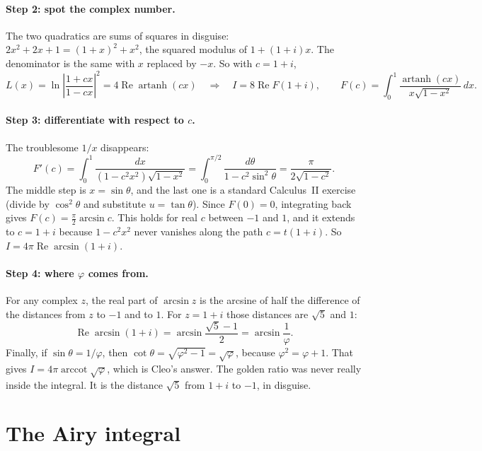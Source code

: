 \documentclass[11pt]{article}
\DeclareMathOperator{\arccot}{arccot}
\DeclareMathOperator{\artanh}{artanh}
\renewcommand{\Re}{\operatorname{Re}}
\begin{document}
\paragraph{Step 2: spot the complex number.} The two quadratics are sums of squares in disguise: $2x^2+2x+1=(1+x)^2+x^2$, the squared modulus of $1+(1+i)x$. The denominator is the same with $x$ replaced by $-x$. So with $c=1+i$,
\[
L(x)=\ln\left|\frac{1+cx}{1-cx}\right|^2=4\Re\artanh(cx)
\quad\Longrightarrow\quad
I=8\Re F(1+i),\qquad F(c)=\int_0^1\frac{\artanh(cx)}{x\sqrt{1-x^2}}\,dx.
\]

\paragraph{Step 3: differentiate with respect to $c$.} The troublesome $1/x$ disappears:
\[
F'(c)=\int_0^1\frac{dx}{(1-c^2x^2)\sqrt{1-x^2}}=\int_0^{\pi/2}\frac{d\theta}{1-c^2\sin^2\theta}=\frac{\pi}{2\sqrt{1-c^2}}.
\]
The middle step is $x=\sin\theta$, and the last one is a standard Calculus~II exercise (divide by $\cos^2\theta$ and substitute $u=\tan\theta$). Since $F(0)=0$, integrating back gives $F(c)=\frac{\pi}{2}\arcsin c$. This holds for real $c$ between $-1$ and $1$, and it extends to $c=1+i$ because $1-c^2x^2$ never vanishes along the path $c=t(1+i)$. So $I=4\pi\Re\arcsin(1+i)$.

\paragraph{Step 4: where $\varphi$ comes from.} For any complex $z$, the real part of $\arcsin z$ is the arcsine of half the difference of the distances from $z$ to $-1$ and to $1$. For $z=1+i$ those distances are $\sqrt5$ and $1$:
\[
\Re\arcsin(1+i)=\arcsin\frac{\sqrt5-1}{2}=\arcsin\frac{1}{\varphi}.
\]
Finally, if $\sin\theta=1/\varphi$, then $\cot\theta=\sqrt{\varphi^2-1}=\sqrt{\varphi}$, because $\varphi^2=\varphi+1$. That gives $I=4\pi\arccot\sqrt{\varphi}$, which is Cleo's answer. The golden ratio was never really inside the integral. It is the distance $\sqrt5$ from $1+i$ to $-1$, in disguise.

\section*{The Airy integral}
\end{document}
